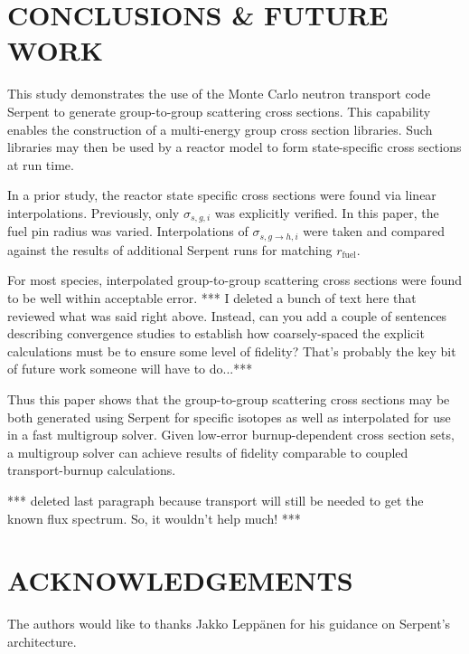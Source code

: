 \documentclass{physor2012}
\begin{document}

\section{CONCLUSIONS \& FUTURE WORK}
\label{sec:conclusions}

This study demonstrates the use of the Monte Carlo neutron transport code Serpent to generate group-to-group scattering
cross sections.  This capability enables the construction of a multi-energy
group cross section libraries.  Such libraries may then be used by a reactor
model to form state-specific cross sections at run time.

In a prior study, the reactor state specific cross sections were found
via linear interpolations.  Previously, only $\sigma_{s,g,i}$ was
explicitly verified.  In this paper, the fuel pin radius was varied.
Interpolations of $\sigma_{s,g\to h,i}$ were taken and compared against
the results of additional Serpent runs for matching $r_{\mbox{fuel}}$.

For most species, interpolated group-to-group scattering cross sections
were found to be well within acceptable error.  *** I deleted a bunch of text here that reviewed what was said right above.  Instead, can you add a couple of sentences describing convergence studies to establish how coarsely-spaced the explicit calculations must be to ensure some level of fidelity?  That's probably the key bit of future work someone will have to do...***

Thus this paper shows that the group-to-group scattering cross sections may be
both generated using Serpent for specific isotopes as well as interpolated for use in a fast multigroup solver.  Given low-error burnup-dependent cross section sets, a multigroup solver can achieve results of fidelity comparable to coupled transport-burnup calculations.

*** deleted last paragraph because transport will still be needed to get the known flux spectrum.  So, it wouldn't help much! ***


\section*{ACKNOWLEDGEMENTS}
The authors would like to thanks Jakko Leppänen for his guidance
on Serpent's architecture.


%
\setlength{\baselineskip}{12pt}


\end{document}
